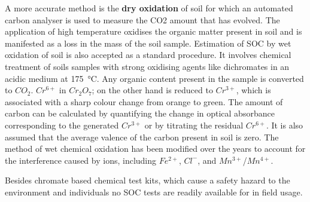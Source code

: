 A more accurate method is the \textbf{dry oxidation} of soil for which an automated carbon analyser is used to measure the \gls{CO2} amount that has evolved. The application of high temperature oxidises the organic matter present in soil and is manifested as a loss in the mass of the soil sample. Estimation of \gls{SOC} by wet oxidation of soil is also accepted as a standard procedure. It involves chemical treatment of soils samples with strong oxidising agents like dichromates in an acidic medium at \SI{175}{\celsius}. Any organic content present in the sample is converted to $CO_{2}$. $Cr^{6+}$ in $Cr_{2}O_{7}$; on the other hand is reduced to $Cr^{3+}$, which is associated with a sharp colour change from orange to green. The amount of carbon can be calculated by quantifying the change in optical absorbance corresponding to the generated $Cr^{3+}$ or by titrating the residual $Cr^{6+}$. It is also assumed that the average valence of the carbon present in soil is zero. The method of wet chemical oxidation has been modified over the years to account for the interference caused by ions, including $Fe^{2+}$, $Cl^{-}$, and $Mn^{3+}$/$Mn^{4+}$.\cite{Chatterjee2009} 

Besides chromate based chemical test kits, which cause a safety hazard to the environment and individuals no \gls{SOC} tests are readily available for in field usage. %



